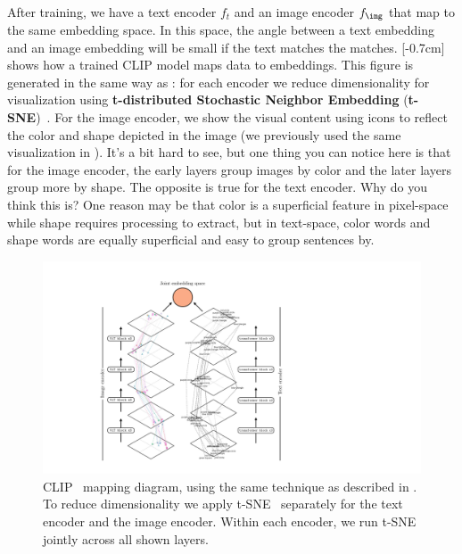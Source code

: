 After training, we have a text encoder $f_t$ and an image encoder $f_\img$ that map to the same embedding space. In this space, the angle between a text embedding and an image embedding will be small if the text matches the matches. [-0.7cm]
\Fig{\ref{fig:vision_and_language:clip_mapping_diagram_two_branch}} shows how a trained CLIP model maps data to embeddings. This figure is generated in the same way as \fig{\ref{fig:neural_nets:vit_mapping_plot}}: for each encoder we reduce dimensionality for visualization using \textbf{t-distributed Stochastic Neighbor Embedding} (\textbf{t-SNE})~\cite{tsne}. For the image encoder, we show the visual content using icons to reflect the color and shape depicted in the image (we previously used the same visualization in \sect{\ref{sec:representation_learning:expt_designing_embeddings_with_contrastive_learning}}). It's a bit hard to see, but one thing you can notice here is that for the image encoder, the early layers group images by color and the later layers group more by shape. The opposite is true for the text encoder. Why do you think this is? One reason may be that color is a superficial feature in pixel-space while shape requires processing to extract, but in text-space, color words and shape words are equally superficial and easy to group sentences by.
\begin{figure}[h]
    \centerline{
        \includegraphics[width=1.0\linewidth]{figures/vision_and_language/clip_mapping_diagram_two_branch.pdf}
        }
        \caption{CLIP~\cite{radford2021learning} mapping diagram, using the same technique as described in \chap{\ref{chapter:neural_nets_as_distribution_transformers}}. To reduce dimensionality we apply t-SNE~\cite{tsne} separately for the text encoder and the image encoder. Within each encoder, we run t-SNE jointly across all shown layers.}
        \label{fig:vision_and_language:clip_mapping_diagram_two_branch}
\end{figure}

